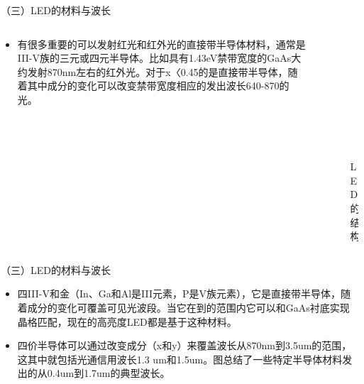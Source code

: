 \documentclass[trans]{beamer} %
\begin{document}
 \begin{frame}{（三）LED的材料与波长}

  \begin{columns}
        \begin{column}{0.6\textwidth}
        
        \begin{itemize}
        \item  有很多重要的可以发射红光和红外光的直接带半导体材料，通常是III-V族的三元或四元半导体。比如具有1.43eV禁带宽度的GaAs大约发射870nm左右的红外光。对于x〈0.45的是直接带半导体，随着其中成分的变化可以改变禁带宽度相应的发出波长640-870的光。
    \end{itemize}
        \end{column}
        \begin{column}{0.4\textwidth}
        \begin{figure}[htbp] 
    \centering\includegraphics[height=1.75in]{source/ch2/fg228.png} 
    \caption{LED的结构}
    \end{figure}
        \end{column}
        \end{columns}
    
    
        
 \end{frame}

 \begin{frame}{（三）LED的材料与波长}

    \begin{itemize}
        \item  四III-V和金（In、Ga和Al是III元素，P是V族元素），它是直接带半导体，随着成分的变化可覆盖可见光波段。当它在到的范围内它可以和GaAs衬底实现晶格匹配，现在的高亮度LED都是基于这种材料。
        \item  四价半导体可以通过改变成分（x和y）来覆盖波长从870nm到3.5um的范围，这其中就包括光通信用波长1.3 um和1.5um。图总结了一些特定半导体材料发出的从0.4um到1.7um的典型波长。 

    \end{itemize}
 \end{frame} 
\end{document}
